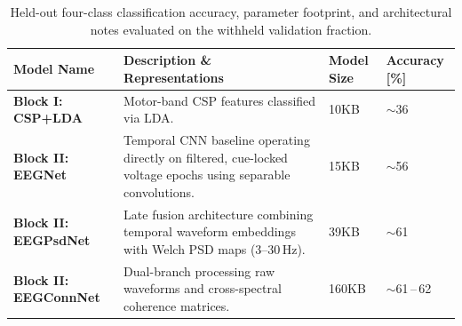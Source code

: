 \begin{table}[htbp]
  \centering
  \begingroup
  \captionsetup{font=normalsize}
  \caption{Held-out four-class classification accuracy, parameter footprint, and architectural notes evaluated on the withheld validation fraction.}
  \label{tab:main}
  \normalsize
  \setlength{\tabcolsep}{10pt}
  \renewcommand{\arraystretch}{1.55}
  \begin{tabularx}{\textwidth}{@{} >{\raggedright\arraybackslash}p{3.5cm} >{\raggedright\arraybackslash}X >{\centering\arraybackslash}p{2.2cm} >{\centering\arraybackslash}p{2.2cm} @{}}
    \toprule
    \textbf{Model Name} & \textbf{Description \& Representations} & \textbf{Model Size} & \textbf{Accuracy [\%]} \\
    \midrule
    \textbf{Block I: CSP+LDA}~\cite{gramfort2013meg} & 
    Motor-band CSP features classified via LDA. & 
    10KB & 
    \(\sim\)36 \\
    
    \textbf{Block II: EEGNet}~\cite{lawhern2018eegnet} & 
    Temporal CNN baseline operating directly on filtered, cue-locked voltage epochs using separable convolutions. & 
    15KB & 
    \(\sim\)56 \\
    
    \textbf{Block II: EEGPsdNet} & 
    Late fusion architecture combining temporal waveform embeddings with Welch PSD maps ($3$--$30\,\text{Hz}$). & 
    39KB & 
    \(\sim\)61 \\
    
    \textbf{Block II: EEGConnNet} & 
    Dual-branch processing raw waveforms and cross-spectral coherence matrices. & 
    160KB & 
    \(\sim\)61\,--\,62 \\
    \bottomrule
  \end{tabularx}
  \endgroup
\end{table}